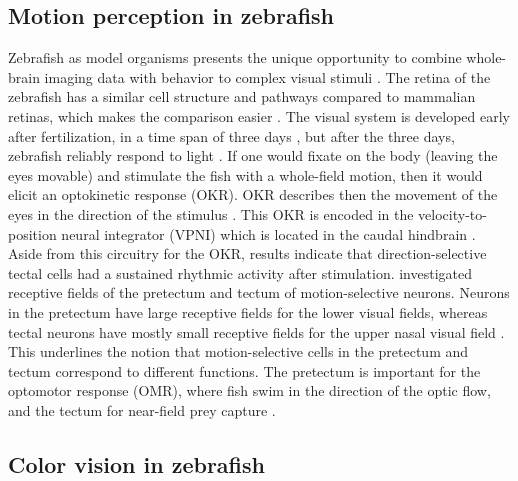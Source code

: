 \subsection{Motion perception in zebrafish}

Zebrafish as model organisms presents the unique opportunity to combine whole-brain imaging data with behavior to complex visual stimuli \parencite{bollmannZebrafishVisualSystem2019}. The retina of the zebrafish has a similar cell structure and pathways compared to mammalian retinas, which makes the comparison easier \parencite{bollmannZebrafishVisualSystem2019}. The visual system is developed early after fertilization, in a time span of three days \parencite{stuermer1988retinotopic}, but after the three days, zebrafish reliably respond to light \parencite{zhang2010development}. If one would fixate on the body (leaving the eyes movable) and stimulate the fish with a whole-field motion, then it would elicit an optokinetic response (OKR). OKR describes then the movement of the eyes in the direction of the stimulus \parencite{brockerhoff1995behavioral}. This OKR is encoded in the velocity-to-position neural integrator (VPNI) which is located in the caudal hindbrain \parencite{miri2011regression, miri2011spatial}. Aside from this circuitry for the OKR, \cite{perez2016sustained} results indicate that direction-selective tectal cells had a sustained rhythmic activity after stimulation. \cite{wangParallelChannelsMotion2020} investigated receptive fields of the pretectum and tectum of motion-selective neurons. Neurons in the pretectum have large receptive fields for the lower visual fields, whereas tectal neurons have mostly small receptive fields for the upper nasal visual field \parencite{wangParallelChannelsMotion2020}. This underlines the notion that motion-selective cells in the pretectum and tectum correspond to different functions. The pretectum is important for the optomotor response (OMR), where fish swim in the direction of the optic flow, and the tectum for near-field prey capture \parencite{wangParallelChannelsMotion2020}. 

\subsection{Color vision in zebrafish}

